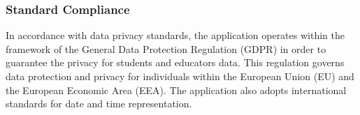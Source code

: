 \subsubsection{Standard Compliance}
In accordance with data privacy standards, the \app application operates within the framework of the General Data Protection Regulation (GDPR) in order to guarantee the privacy for students and educators data. This regulation governs data protection and privacy for individuals within the European Union (EU) and 
the European Economic Area (EEA). 
The application also adopts international standards for date and time representation.

